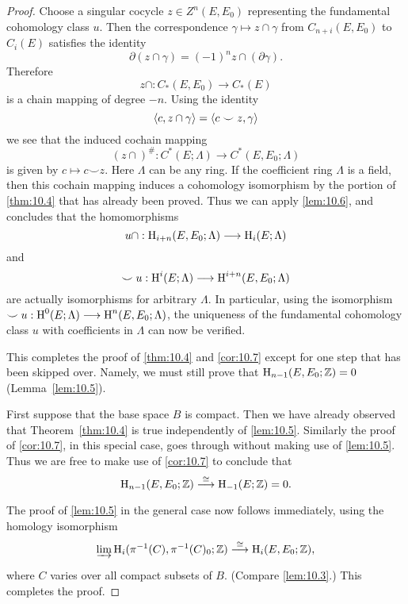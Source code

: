 \documentclass[../main]{subfiles}
\begin{document}
\begin{proof}
Choose a singular cocycle $z \in Z^n(E, E_0)$ representing the fundamental cohomology class $u$. Then the correspondence $\gamma \mapsto z \cap \gamma$ from $C_{n+i}(E, E_0)$ to $C_i(E)$ satisfies the identity \[\partial(z \cap \gamma) = (-1)^n z \cap (\partial \gamma).\] Therefore \[z \cap : C_\ast(E, E_0) \longrightarrow C_\ast(E)\] is a chain mapping of degree $-n$. Using the identity \[\langle c,z \cap \gamma\rangle = \langle c \smile z,\gamma\rangle\] we see that the induced cochain mapping \[(z \cap)^\# : C^\ast(E; \Lambda) \longrightarrow C^\ast(E, E_0; \Lambda)\] is given by $c \mapsto c \smile z$. Here $\Lambda$ can be any ring. If the coefficient ring $\Lambda$ is a field, then this cochain mapping induces a cohomology isomorphism by the portion of \ref{thm:10.4} that has already been proved. Thus we can apply \ref{lem:10.6}, and concludes that the homomorphisms \[u \cap : \operatorname{H}_{i + n}(E, E_0; \Lambda) \longrightarrow \operatorname{H}_i(E; \Lambda)\] and \[\smile u : \operatorname{H}^i(E; \Lambda) \longrightarrow \operatorname{H}^{i + n}(E, E_0; \Lambda)\] are actually isomorphisms for arbitrary $\Lambda$. In particular, using the isomorphism $\smile u : \operatorname{H}^0(E; \Lambda) \longrightarrow \operatorname{H}^n(E, E_0; \Lambda)$, the uniqueness of the fundamental cohomology class $u$ with coefficients in $\Lambda$ can now be verified. 

This completes the proof of \ref{thm:10.4} and \ref{cor:10.7} except for one step that has been skipped over. Namely, we must still prove that $\operatorname{H}_{n - 1}(E, E_0; \mathbb Z) = 0$ (Lemma~\ref{lem:10.5}).

First suppose that the base space $B$ is compact. Then we have already observed that Theorem~\ref{thm:10.4} is true independently of \ref{lem:10.5}. Similarly the proof of \ref{cor:10.7}, in this special case, goes through without making use of \ref{lem:10.5}. Thus we are free to make use of \ref{cor:10.7} to conclude that \[\homology_{n - 1}(E, E_0; \mathbb Z) \varrightarrow{\cong} \homology_{-1}(E; \mathbb Z) = 0.\] The proof of \ref{lem:10.5} in the general case now follows immediately, using the homology isomorphism \[\varinjlim \homology_i(\pi^{-1}(C), \pi^{-1}(C)_0; \mathbb Z) \varrightarrow{\cong} \homology_i(E, E_0; \mathbb Z),\]where $C$ varies over all compact subsets of $B$. (Compare \ref{lem:10.3}.) This completes the proof.
\end{proof}
\end{document}
